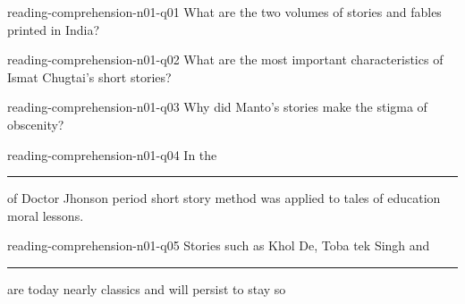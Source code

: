 {\begin{question}{reading-comprehension-n01-q01}
    What are the two volumes of stories and fables printed in India?
    \begin{choices}[o]
    \end{choices}
\end{question}

\begin{question}{reading-comprehension-n01-q02}
    What are the most important characteristics of Ismat Chugtai's short stories?
    \begin{choices}[o]
    \end{choices}
\end{question}

\begin{question}{reading-comprehension-n01-q03}
    Why did Manto's stories make the stigma of obscenity?
    \begin{choices}[o]
    \end{choices}
\end{question}

\begin{question}{reading-comprehension-n01-q04}
    In the \rule[-0.1pt]{4em}{0.1pt}  of Doctor Jhonson period short story method was applied to tales of education moral lessons.
    \begin{choices}
    \end{choices}
\end{question}

\begin{question}{reading-comprehension-n01-q05}
    Stories such as Khol De, Toba tek Singh and \rule[-0.1pt]{4em}{0.1pt} are today nearly classics and will persist to stay so
    \begin{choices}[o]
    \end{choices}
\end{question}
}

